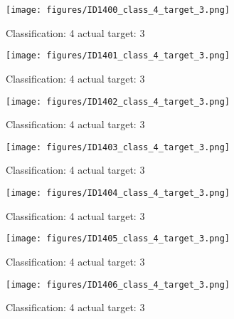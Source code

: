 \begin{figure}[h!]
\begin{center}
\texttt{[image: figures/ID1400\_class\_4\_target\_3.png]}
\end{center}
\caption{ Classification: 4 actual target: 3}
\label{fig:ID1400_class_4_target_3}
\end{figure}
\begin{figure}[h!]
\begin{center}
\texttt{[image: figures/ID1401\_class\_4\_target\_3.png]}
\end{center}
\caption{ Classification: 4 actual target: 3}
\label{fig:ID1401_class_4_target_3}
\end{figure}
\begin{figure}[h!]
\begin{center}
\texttt{[image: figures/ID1402\_class\_4\_target\_3.png]}
\end{center}
\caption{ Classification: 4 actual target: 3}
\label{fig:ID1402_class_4_target_3}
\end{figure}
\begin{figure}[h!]
\begin{center}
\texttt{[image: figures/ID1403\_class\_4\_target\_3.png]}
\end{center}
\caption{ Classification: 4 actual target: 3}
\label{fig:ID1403_class_4_target_3}
\end{figure}
\begin{figure}[h!]
\begin{center}
\texttt{[image: figures/ID1404\_class\_4\_target\_3.png]}
\end{center}
\caption{ Classification: 4 actual target: 3}
\label{fig:ID1404_class_4_target_3}
\end{figure}
\begin{figure}[h!]
\begin{center}
\texttt{[image: figures/ID1405\_class\_4\_target\_3.png]}
\end{center}
\caption{ Classification: 4 actual target: 3}
\label{fig:ID1405_class_4_target_3}
\end{figure}
\begin{figure}[h!]
\begin{center}
\texttt{[image: figures/ID1406\_class\_4\_target\_3.png]}
\end{center}
\caption{ Classification: 4 actual target: 3}
\label{fig:ID1406_class_4_target_3}
\end{figure}
